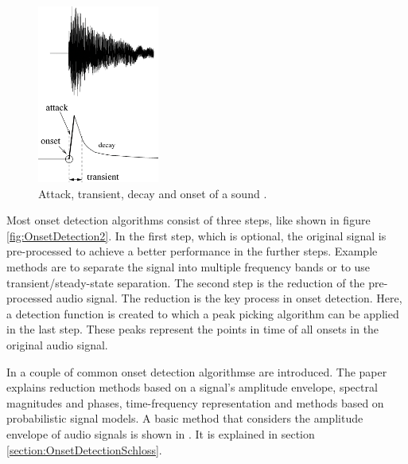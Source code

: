 \begin{figure}[h]
	\centering
	\includegraphics[width=4.0cm]{images/bello_2005_Seite_01_Bild_0001.png}
	\caption{Attack, transient, decay and onset of a sound \autocite[Fig. 1]{Bello:2005}.}
	\label{fig:OnsetDetection1}
\end{figure}

Most onset detection algorithms consist of three steps, like shown in figure \ref{fig:OnsetDetection2}. In the first step, which is optional, the original signal is pre-processed to achieve a better performance in the further steps. Example methods are to separate the signal into multiple frequency bands or to use transient/steady-state separation. The second step is the reduction of the pre-processed audio signal. The reduction is the key process in onset detection. Here, a detection function is created to which a peak picking algorithm can be applied in the last step. These peaks represent the points in time of all onsets in the original audio signal. 

In \autocite[]{Bello:2005} a couple of common onset detection algorithmse are introduced. The paper explains reduction methods based on a signal's amplitude envelope, spectral magnitudes and phases, time-frequency representation and methods based on probabilistic signal models. A basic method that considers the amplitude envelope of audio signals is shown in \autocite[]{Schloss:1985}. It is explained in section \ref{section:OnsetDetectionSchloss}.

